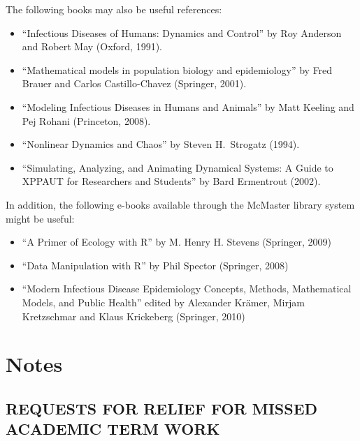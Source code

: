 \documentclass[12pt]{article}
\begin{document}
The following books may also be useful references:
\vspace{-0.25cm}
\begin{itemize}\addtolength{\itemsep}{-0.5\baselineskip}
\item ``Infectious Diseases of Humans: Dynamics and Control'' by Roy Anderson and Robert May (Oxford, 1991).

\item ``Mathematical models in population biology and epidemiology'' by Fred Brauer
and Carlos Castillo-Chavez (Springer, 2001).

\item ``Modeling Infectious Diseases in Humans and Animals'' by Matt Keeling and Pej Rohani (Princeton, 2008).

\item ``Nonlinear Dynamics and Chaos'' by Steven H.\ Strogatz (1994).

\item ``Simulating, Analyzing, and Animating Dynamical Systems: A Guide to XPPAUT for Researchers and Students'' by Bard Ermentrout (2002).

\end{itemize}
In addition, the following e-books available through the McMaster library system might be useful:
\begin{itemize}\addtolength{\itemsep}{-0.5\baselineskip}

\item ``A Primer of Ecology with R'' by M. Henry H. Stevens (Springer, 2009)

\item ``Data Manipulation with R'' by Phil Spector (Springer, 2008)

\item ``Modern Infectious Disease Epidemiology Concepts, Methods, Mathematical Models, and Public Health'' edited by Alexander Kr\"amer, Mirjam Kretzschmar and Klaus Krickeberg (Springer, 2010)

\end{itemize}

\section*{Notes}

\subsection*{REQUESTS FOR RELIEF FOR MISSED ACADEMIC TERM WORK}
\end{document}
